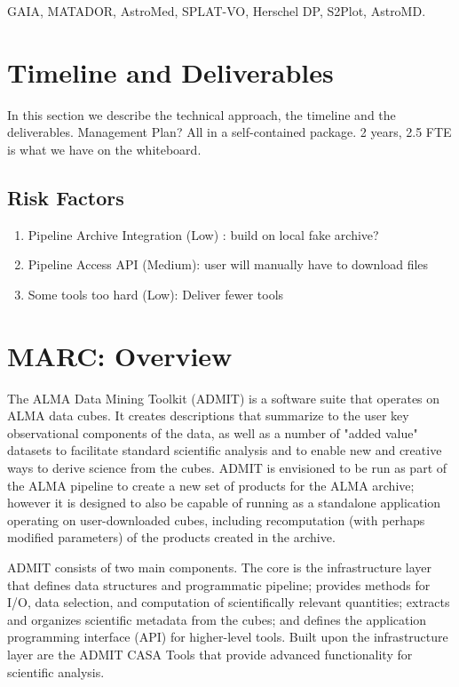\documentclass[preprint]{aastex} %
\begin{document}
GAIA, MATADOR, AstroMed, SPLAT-VO, Herschel DP, S2Plot, AstroMD. 


\section{Timeline and Deliverables}

In this section we describe the technical approach, the
timeline and the deliverables. Management Plan? 
All in a self-contained package.
2 years, 2.5 FTE is what we have on the whiteboard.

\subsection{Risk Factors}

\begin{enumerate}
\item
Pipeline Archive Integration (Low) : build on local fake archive?
\item
Pipeline Access API (Medium): user will manually have to download files
\item
Some tools too hard (Low): Deliver fewer tools

\end{enumerate}

\section { MARC: Overview }
The ALMA Data Mining Toolkit (ADMIT) is a software suite that operates on
ALMA data cubes. It creates descriptions that summarize to the user key
observational components of the data, as well as a number of "added value"
datasets to facilitate standard scientific analysis and to enable new and
creative ways to derive science from the cubes.  ADMIT is envisioned to
be run as part of the ALMA pipeline to create a new set of products for
the ALMA archive; however it is designed to also be capable of running
as a standalone application operating on user-downloaded cubes, including
recomputation (with perhaps modified parameters) of the products created
in the archive.

ADMIT consists of two main components. The core is the infrastructure layer
that defines data structures and programmatic pipeline; provides methods
for I/O, data selection, and computation of scientifically relevant
quantities; extracts and organizes scientific metadata from the cubes; and
defines the application programming interface (API) for higher-level tools.
Built upon the infrastructure layer are the ADMIT CASA Tools that provide
advanced functionality for scientific analysis.
\end{document}
